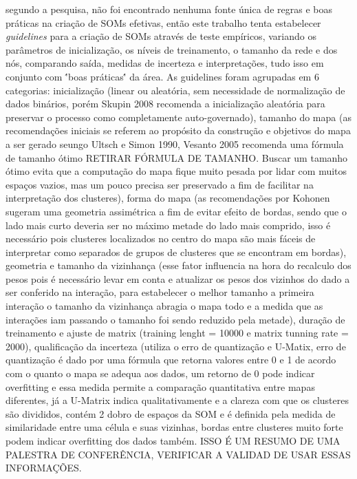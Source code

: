 \cite{wendel2010formalizing} segundo a pesquisa, não foi encontrado nenhuma fonte única de regras e boas práticas na criação de SOMs efetivas, então este trabalho tenta estabelecer \textit{guidelines} para a criação de SOMs através de teste empíricos, variando os parâmetros de inicialização, os níveis de treinamento, o tamanho da rede e dos nós, comparando saída, medidas de incerteza e interpretações, tudo isso em conjunto com \''boas práticas\'' da área. As guidelines foram agrupadas em 6 categorias: inicialização (linear ou aleatória, sem necessidade de normalização de dados binários, porém Skupin 2008 recomenda a inicialização aleatória para preservar o processo como completamente auto-governado), tamanho do mapa (as recomendações iniciais se referem ao propósito da construção e objetivos do mapa a ser gerado seungo Ultsch e Simon 1990, Vesanto 2005 recomenda uma fórmula de tamanho ótimo RETIRAR FÓRMULA DE TAMANHO. Buscar um tamanho ótimo evita que a computação do mapa fique muito pesada por lidar com muitos espaços vazios, mas um pouco precisa ser preservado a fim de facilitar na interpretação dos clusteres), forma do mapa (as recomendações por Kohonen sugeram uma geometria assimétrica a fim de evitar efeito de bordas, sendo que o lado mais curto deveria ser no máximo metade do lado mais comprido, isso é necessário pois clusteres localizados no centro do mapa são mais fáceis de interpretar como separados de grupos de clusteres que se encontram em bordas), geometria e tamanho da vizinhança (esse fator influencia na hora do recalculo dos pesos pois é necessário levar em conta e atualizar os pesos dos vizinhos do dado a ser conferido na interação, para estabelecer o melhor tamanho a primeira interação o tamanho da vizinhança abragia o mapa todo e a medida que as interações iam passando o tamanho foi sendo reduzido pela metade), duração de treinamento e ajuste de matrix (training lenght = 10000 e matrix tunning rate = 2000), qualificação da incerteza (utiliza o erro de quantização e U-Matix, erro de quantização é dado por uma fórmula que retorna valores entre 0 e 1 de acordo com o quanto o mapa se adequa aos dados, um retorno de 0 pode indicar overfitting e essa medida permite a comparação quantitativa entre mapas diferentes, já a U-Matrix indica qualitativamente e a clareza com que os clusteres são divididos, contém 2 dobro de espaços da SOM e é definida pela medida de similaridade entre uma célula e suas vizinhas, bordas entre clusteres muito forte podem indicar overfitting dos dados também. ISSO É UM RESUMO DE UMA PALESTRA DE CONFERÊNCIA, VERIFICAR A VALIDAD DE USAR ESSAS INFORMAÇÕES.

